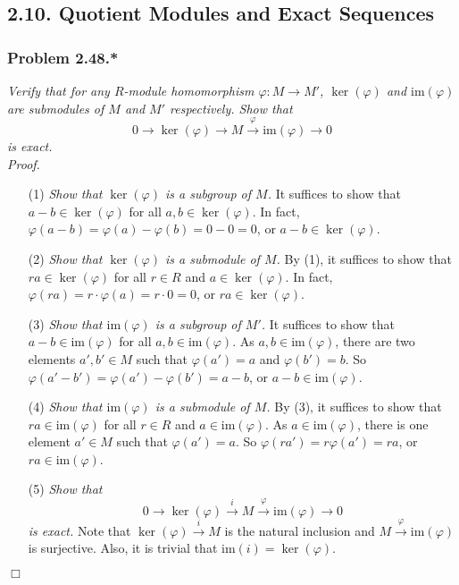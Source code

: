 \documentclass{article}
\begin{document}
\subsection*{2.10. Quotient Modules and Exact Sequences \\}



\subsubsection*{Problem 2.48.*}
\emph{Verify that for any $R$-module homomorphism $\varphi: M \to M'$,
$\ker(\varphi)$ and $\mathrm{im}(\varphi)$ are submodules of $M$ and $M'$ respectively.
Show that
\[
  0
  \to \ker(\varphi)
  \to M
  \xrightarrow{\varphi} \mathrm{im}(\varphi)
  \to 0
\]
is exact.} \\



\emph{Proof.}
\begin{enumerate}
\item[(1)]
  \emph{Show that $\ker(\varphi)$ is a subgroup of $M$.}
  It suffices to show that $a - b \in \ker(\varphi)$ for all $a, b \in \ker(\varphi)$.
  In fact, $\varphi(a - b) = \varphi(a) - \varphi(b) = 0 - 0 = 0$,
  or $a - b \in \ker(\varphi)$.

\item[(2)]
  \emph{Show that $\ker(\varphi)$ is a submodule of $M$.}
  By (1), it suffices to show that $ra \in \ker(\varphi)$ for all $r \in R$ and $a \in \ker(\varphi)$.
  In fact, $\varphi(ra) = r \cdot \varphi(a) = r \cdot 0 = 0$,
  or $ra \in \ker(\varphi)$.

\item[(3)]
  \emph{Show that $\mathrm{im}(\varphi)$ is a subgroup of $M'$.}
  It suffices to show that $a - b \in \mathrm{im}(\varphi)$ for all $a, b \in \mathrm{im}(\varphi)$.
  As $a, b \in \mathrm{im}(\varphi)$,
  there are two elements $a', b' \in M$ such that $\varphi(a') = a$ and $\varphi(b') = b$.
  So $\varphi(a' - b') = \varphi(a') - \varphi(b') = a - b$,
  or $a - b \in \mathrm{im}(\varphi)$.

\item[(4)]
  \emph{Show that $\mathrm{im}(\varphi)$ is a submodule of $M$.}
  By (3), it suffices to show that $ra \in \mathrm{im}(\varphi)$
  for all $r \in R$ and $a \in \mathrm{im}(\varphi)$.
  As $a \in \mathrm{im}(\varphi)$,
  there is one element $a' \in M$ such that $\varphi(a') = a$.
  So $\varphi(ra') = r\varphi(a') = ra$,
  or $ra \in \mathrm{im}(\varphi)$.

\item[(5)]
  \emph{Show that
  \[
    0
    \to \ker(\varphi)
    \xrightarrow{i} M
    \xrightarrow{\varphi} \mathrm{im}(\varphi)
    \to 0
  \]
  is exact.}
  Note that $\ker(\varphi) \xrightarrow{i} M$ is the natural inclusion
  and $M \xrightarrow{\varphi} \mathrm{im}(\varphi)$ is surjective.
  Also, it is trivial that $\mathrm{im}(i) = \ker(\varphi)$.
\end{enumerate}
$\Box$ \\\\
\end{document}
